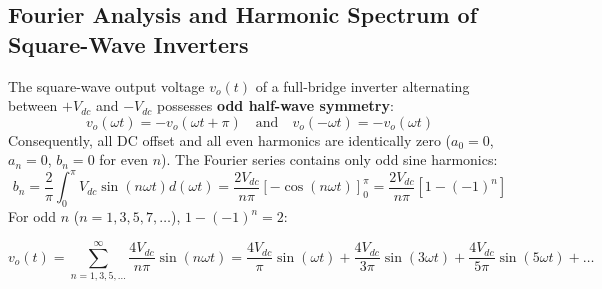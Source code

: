 \documentclass[11pt,a4paper]{article}
\let\origsubsection\subsection
\renewcommand{\subsection}{\Needspace{7\baselineskip}\origsubsection}
\begin{document}
\subsection{Fourier Analysis and Harmonic Spectrum of Square-Wave Inverters}

The square-wave output voltage $v_o(t)$ of a full-bridge inverter alternating between $+V_{dc}$ and $-V_{dc}$ possesses \textbf{odd half-wave symmetry}:
\begin{equation}
v_o(\omega t) = -v_o(\omega t + \pi) \quad \text{and} \quad v_o(-\omega t) = -v_o(\omega t)
\end{equation}
Consequently, all DC offset and all even harmonics are identically zero ($a_0 = 0$, $a_n = 0$, $b_n = 0$ for even $n$). The Fourier series contains only odd sine harmonics:
\begin{equation}
b_n = \frac{2}{\pi} \int_0^\pi V_{dc} \sin(n\omega t) d(\omega t) = \frac{2V_{dc}}{n\pi} \left[-\cos(n\omega t)\right]_0^\pi = \frac{2V_{dc}}{n\pi} \left[1 - (-1)^n\right]
\end{equation}
For odd $n$ ($n = 1, 3, 5, 7, \dots$), $1 - (-1)^n = 2$:
\begin{formulabox}
\begin{equation}
v_o(t) = \sum_{n=1,3,5,\dots}^{\infty} \frac{4V_{dc}}{n\pi} \sin(n\omega t) = \frac{4V_{dc}}{\pi} \sin(\omega t) + \frac{4V_{dc}}{3\pi} \sin(3\omega t) + \frac{4V_{dc}}{5\pi} \sin(5\omega t) + \dots
\label{eq:fourier_square_full}
\end{equation}
\end{formulabox}
\end{document}
